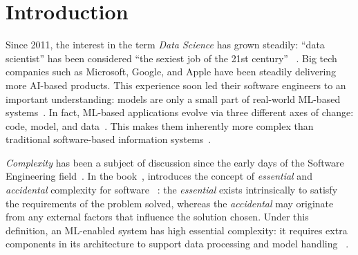 
\chapter{Introduction}
\label{chap:introduction}


  Since 2011, the interest in the term \emph{Data Science} has grown steadily:
  ``data scientist'' has been considered ``the sexiest job of the 21st century''%
  ~\parencite{Cao2018DataScience,Davenport2012DataCentury}. Big tech companies
  such as Microsoft, Google, and Apple have been steadily delivering more
  AI-based products. This experience soon led their software engineers to
  an important understanding: models are only a small part of real-world
  ML-based systems~\parencite{Hulten2018BuildingSystems,Sculley2015HiddenSystems}.
  In fact, ML-based applications evolve via three different axes of change:
  code, model, and data~\parencite{Sato2019ContinuousLearning}.
  This makes them inherently more complex than traditional software-based
  information systems~\parencite{Amershi2019SoftwareStudy,
  Burkov2020MachineEngineering}.

  \emph{Complexity} has been a subject of discussion since the early
  days of the Software Engineering field~\parencite{Brooks1975TheMan-Month,
  Parnas1985TheSystems}. In the book~,
  \citeauthor{Brooks1975TheMan-Month} introduces the concept of
  \emph{essential} and \emph{accidental} complexity for software%
  ~\parencite{Brooks1975TheMan-Month}:
    the \emph{essential} exists intrinsically to satisfy the requirements
    of the problem solved, whereas the \emph{accidental} may originate
    from any external factors that influence the solution chosen.
  Under this definition, an ML-enabled system has high essential
  complexity: it requires extra components in its architecture to
  support data processing and model handling%
  ~\parencite{Amershi2019SoftwareStudy,Lakshmanan2020MachinePatterns}.

